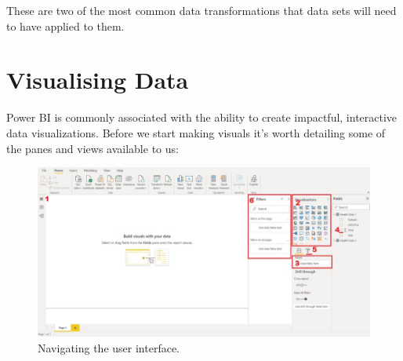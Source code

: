\documentclass[
]{book}
\begin{document}
These are two of the most common data transformations that data sets will need to have applied to them.

\hypertarget{visualising-data}{%
\section{Visualising Data}\label{visualising-data}}

Power BI is commonly associated with the ability to create impactful, interactive data visualizations. Before we start making visuals it's worth detailing some of the panes and views available to us:

\begin{figure}
\centering
\includegraphics{bi5.jpg}
\caption{Navigating the user interface.}
\end{figure}
\end{document}
